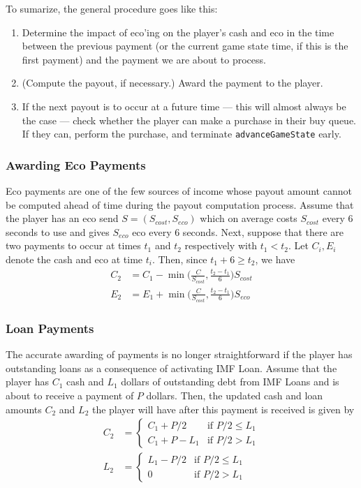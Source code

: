 \documentclass[12pt,letterpaper]{article}
\theoremstyle{remark}
\theoremstyle{plain}
\begin{document}
To sumarize, the general procedure goes like this:

\begin{enumerate}
    \item Determine the impact of eco'ing on the player's cash and eco in the time between the previous payment (or the current game state time, if this is the first payment) and the payment we are about to process.
    \item (Compute the payout, if necessary.) Award the payment to the player.
    \item If the next payout is to occur at a future time --- this will almost always be the case --- check whether the player can make a purchase in their buy queue. If they can, perform the purchase, and terminate \texttt{advanceGameState} early.
\end{enumerate}

\subsubsection{Awarding Eco Payments}

Eco payments are one of the few sources of income whose payout amount cannot be computed ahead of time during the payout computation process. Assume that the player has an eco send $S = (S_{cost}, S_{eco})$ which on average costs $S_{cost}$ every 6 seconds to use and gives $S_{eco}$ eco every $6$ seconds. Next, suppose that there are two payments to occur at times $t_1$ and $t_2$ respectively with $t_1 < t_2$. Let $C_i,E_i$ denote the cash and eco at time $t_i$. Then, since $t_1 + 6 \geq t_2$, we have
\begin{align}
    C_2 &= C_1 - \min\Big(\frac{C}{S_{cost}}, \frac{t_2-t_1}{6}\Big)S_{cost} \\
    E_2 &= E_1 + \min\Big(\frac{C}{S_{cost}}, \frac{t_2-t_1}{6}\Big)S_{eco}
\end{align}

\subsubsection{Loan Payments}

The accurate awarding of payments is no longer straightforward if the player has outstanding loans as a consequence of activating IMF Loan. Assume that the player has $C_1$ cash and $L_1$ dollars of outstanding debt from IMF Loans and is about to receive a payment of $P$ dollars. Then, the updated cash and loan amounts $C_2$ and $L_2$ the player will have after this payment is received is given by
\begin{align}\label{loan payment formula}
    C_2 &= \begin{cases}
    C_1 + P/2 & \text{if } P/2 \leq L_1 \\
    C_1 + P - L_1 & \text{if } P/2 > L_1
    \end{cases} \\
    L_2 &= \begin{cases}
    L_1 - P/2 & \text{if } P/2 \leq L_1 \\
    0 & \text{if } P/2 > L_1
    \end{cases}
\end{align}
\end{document}
